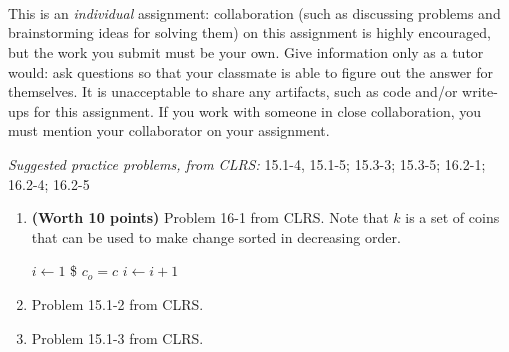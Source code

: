 \documentclass[letterpaper,11pt]{article}
\begin{document}


 \\

 \\
 \\

This is an \emph{individual} assignment: collaboration (such as discussing problems and brainstorming ideas for solving them) on this assignment is highly encouraged, but the work you submit must be your own. Give information only as a tutor would: ask questions so that your classmate is able to figure out the answer for themselves. It is unacceptable to share any artifacts, such as code and/or write-ups for this assignment. If you work with someone in close collaboration, you must mention your collaborator on your assignment.

\emph{Suggested practice problems, from CLRS:} 15.1-4, 15.1-5; 15.3-3; 15.3-5; 16.2-1; 16.2-4; 16.2-5

\begin{enumerate}
\item \textbf{(Worth 10 points)} Problem 16-1 from CLRS.
Note that $k$ is a set of coins that can be used to make change sorted in decreasing order.
\begin{algorithm}
\begin{algorithmic}[1]
\State $i \gets 1$
\$
\State $c_o = c$
\EndIf
\State $i \gets i +1$
\EndWhile
\EndFunction
\end{algorithmic}
\end{algorithm}
\item Problem 15.1-2 from CLRS.
\item Problem 15.1-3 from CLRS.

\end{enumerate}
\end{document}
